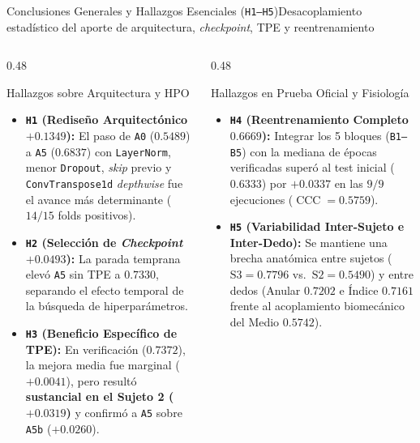 
\begin{frame}{Conclusiones Generales y Hallazgos Esenciales (\texttt{H1--H5})}{Desacoplamiento estad\'istico del aporte de arquitectura, \textit{checkpoint}, TPE y reentrenamiento \cite{rodas_valencia_tpe_ecog}}
  \begin{columns}[T,onlytextwidth]
    \begin{column}{0.48\textwidth}
      \begin{block}{Hallazgos sobre Arquitectura y HPO}
        \scriptsize
        \begin{itemize}\setlength{\itemsep}{1.5pt}
          \item \textbf{\texttt{H1} (Redise\~no Arquitect\'onico $\mathbf{+0.1349}$):} El paso de \texttt{A0} ($0.5489$) a \texttt{A5} ($0.6837$) con \texttt{LayerNorm}, menor \texttt{Dropout}, \textit{skip} previo y \texttt{ConvTranspose1d} \textit{depthwise} fue el avance m\'as determinante ($14/15$ folds positivos).
          \item \textbf{\texttt{H2} (Selecci\'on de \textit{Checkpoint} $\mathbf{+0.0493}$):} La parada temprana elev\'o \texttt{A5} sin TPE a $\mathbf{0.7330}$, separando el efecto temporal de la b\'usqueda de hiperpar\'ametros.
          \item \textbf{\texttt{H3} (Beneficio Espec\'ifico de TPE):} En verificaci\'on ($0.7372$), la mejora media fue marginal ($+0.0041$), pero result\'o \textbf{sustancial en el Sujeto 2 ($\mathbf{+0.0319}$)} y confirm\'o a \texttt{A5} sobre \texttt{A5b} ($+0.0260$).
        \end{itemize}
      \end{block}
    \end{column}

    \begin{column}{0.48\textwidth}
      \begin{alertblock}{Hallazgos en Prueba Oficial y Fisiolog\'ia}
        \scriptsize
        \begin{itemize}\setlength{\itemsep}{1.5pt}
          \item \textbf{\texttt{H4} (Reentrenamiento Completo $\mathbf{0.6669}$):} Integrar los 5 bloques (\texttt{B1--B5}) con la mediana de \'epocas verificadas super\'o al test inicial ($0.6333$) por $\mathbf{+0.0337}$ en las $9/9$ ejecuciones ($\operatorname{CCC}=0.5759$).
          \item \textbf{\texttt{H5} (Variabilidad Inter-Sujeto e Inter-Dedo):} Se mantiene una brecha anat\'omica entre sujetos ($\text{S3}=0.7796$ vs.\ $\text{S2}=0.5490$) y entre dedos (Anular $0.7202$ e \'Indice $0.7161$ frente al acoplamiento biomec\'anico del Medio $0.5742$).
        \end{itemize}
      \end{alertblock}
    \end{column}
  \end{columns}


\end{frame}
